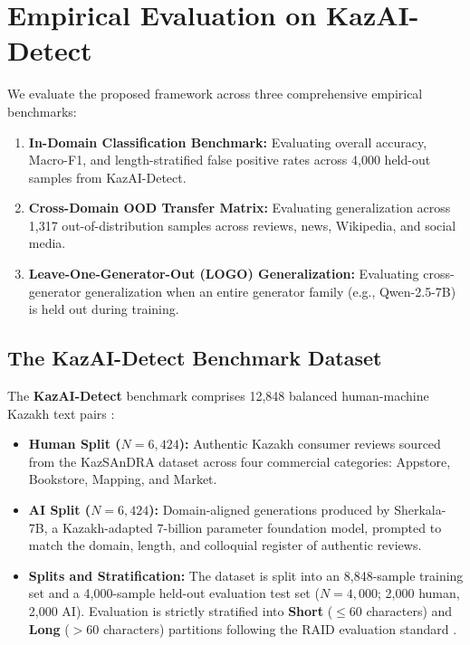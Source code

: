 \section{Empirical Evaluation on KazAI-Detect}
\label{sec:empirical_evaluation}

We evaluate the proposed framework across three comprehensive empirical benchmarks:
\begin{enumerate}
    \item \textbf{In-Domain Classification Benchmark:} Evaluating overall accuracy, Macro-F1, and length-stratified false positive rates across 4,000 held-out samples from KazAI-Detect.
    \item \textbf{Cross-Domain OOD Transfer Matrix:} Evaluating generalization across 1,317 out-of-distribution samples across reviews, news, Wikipedia, and social media.
    \item \textbf{Leave-One-Generator-Out (LOGO) Generalization:} Evaluating cross-generator generalization when an entire generator family (e.g., Qwen-2.5-7B) is held out during training.
\end{enumerate}

\subsection{The KazAI-Detect Benchmark Dataset}
The \textbf{KazAI-Detect} benchmark comprises 12,848 balanced human-machine Kazakh text pairs \citep{anekesh2026detecting}:
\begin{itemize}
    \item \textbf{Human Split ($N=6,424$):} Authentic Kazakh consumer reviews sourced from the KazSAnDRA dataset \citep{yeshpanov2024kazsandra} across four commercial categories: Appstore, Bookstore, Mapping, and Market.
    \item \textbf{AI Split ($N=6,424$):} Domain-aligned generations produced by Sherkala-7B, a Kazakh-adapted 7-billion parameter foundation model, prompted to match the domain, length, and colloquial register of authentic reviews.
    \item \textbf{Splits and Stratification:} The dataset is split into an 8,848-sample training set and a 4,000-sample held-out evaluation test set ($N=4,000$; 2,000 human, 2,000 AI). Evaluation is strictly stratified into \textbf{Short} ($\le 60$ characters) and \textbf{Long} ($> 60$ characters) partitions following the RAID evaluation standard \citep{wang2024raid}.
\end{itemize}


